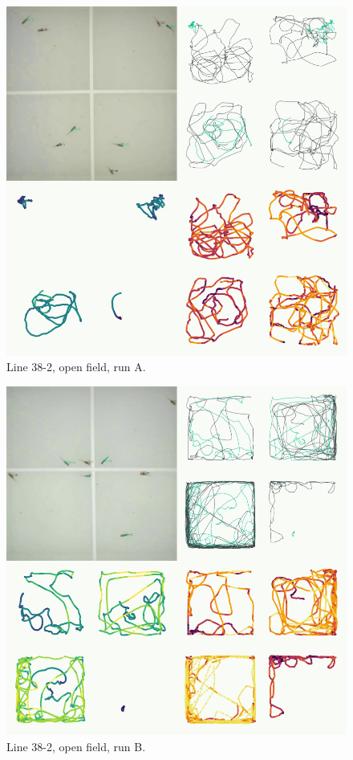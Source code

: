 \documentclass[
]{book}
\begin{document}
\begin{figure}
\includegraphics[width=1\linewidth]{figs/mikk_behaviour/four_panel_plots/open_field_20191112_1456_38-2_L_A_300} \caption{Line 38-2, open field, run A.}\label{fig:4p-38-2-of-A}
\end{figure}



\begin{figure}
\includegraphics[width=1\linewidth]{figs/mikk_behaviour/four_panel_plots/open_field_20191116_1203_38-2_L_B_300} \caption{Line 38-2, open field, run B.}\label{fig:4p-38-2-of-B}
\end{figure}
\end{document}
